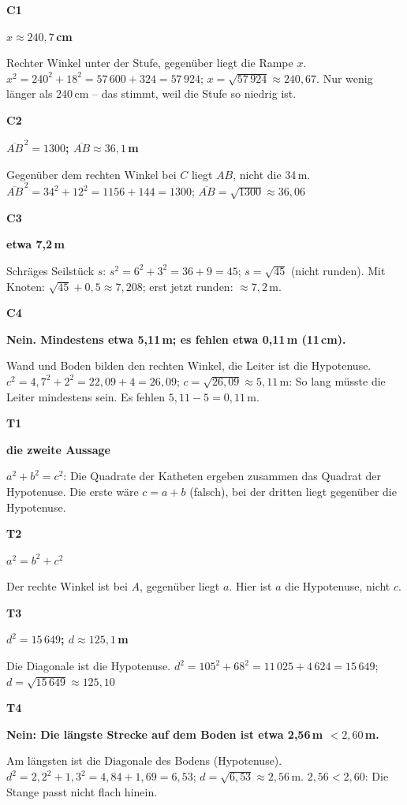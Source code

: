 \documentclass[11pt]{article}
\newcommand{\lsg}[3]{\par\noindent\begin{minipage}[t]{9mm}\textbf{#1}\end{minipage}%
  \begin{minipage}[t]{52mm}\raggedright\bfseries\boldmath #2\end{minipage}\hspace{3mm}%
  \begin{minipage}[t]{\dimexpr\linewidth-64mm\relax}\raggedright\small #3\end{minipage}\par\vspace{4pt}}
\begin{document}
\par\Needspace{25mm}\vspace{6pt}\noindent\colorbox{black!12}{}\hspace{2mm}{\bfseries Sachaufgaben: Leiter, Rampe, Gelände}\par\vspace{4pt}
\lsg{C1}{$x \approx 240{,}7$\,cm}{Rechter Winkel unter der Stufe, gegenüber liegt die Rampe $x$. $x^2 = 240^2 + 18^2 = 57\,600 + 324 = 57\,924$; $x = \sqrt{57\,924} \approx 240{,}67$. Nur wenig länger als 240\,cm – das stimmt, weil die Stufe so niedrig ist.}
\lsg{C2}{$\overline{AB}^{\,2} = 1300$; $\overline{AB} \approx 36{,}1$\,m}{Gegenüber dem rechten Winkel bei $C$ liegt $AB$, nicht die 34\,m. $\overline{AB}^{\,2} = 34^2 + 12^2 = 1156 + 144 = 1300$; $\overline{AB} = \sqrt{1300} \approx 36{,}06$}
\lsg{C3}{etwa 7,2\,m}{Schräges Seilstück $s$: $s^2 = 6^2 + 3^2 = 36 + 9 = 45$; $s = \sqrt{45}$ (nicht runden). Mit Knoten: $\sqrt{45} + 0{,}5 \approx 7{,}208$; erst jetzt runden: $\approx 7{,}2$\,m.}
\lsg{C4}{Nein. Mindestens etwa 5,11\,m; es fehlen etwa 0,11\,m (11\,cm).}{Wand und Boden bilden den rechten Winkel, die Leiter ist die Hypotenuse. $c^2 = 4{,}7^2 + 2^2 = 22{,}09 + 4 = 26{,}09$; $c = \sqrt{26{,}09} \approx 5{,}11$\,m: So lang müsste die Leiter mindestens sein. Es fehlen $5{,}11 - 5 = 0{,}11$\,m.}
\par\Needspace{25mm}\vspace{6pt}\noindent\colorbox{black!12}{}\hspace{2mm}{\bfseries Probetest}\par\vspace{4pt}
\lsg{T1}{die zweite Aussage}{$a^2 + b^2 = c^2$: Die Quadrate der Katheten ergeben zusammen das Quadrat der Hypotenuse. Die erste wäre $c = a + b$ (falsch), bei der dritten liegt gegenüber die Hypotenuse.}
\lsg{T2}{$a^2 = b^2 + c^2$}{Der rechte Winkel ist bei $A$, gegenüber liegt $a$. Hier ist $a$ die Hypotenuse, nicht $c$.}
\lsg{T3}{$d^2 = 15\,649$; $d \approx 125{,}1$\,m}{Die Diagonale ist die Hypotenuse. $d^2 = 105^2 + 68^2 = 11\,025 + 4\,624 = 15\,649$; $d = \sqrt{15\,649} \approx 125{,}10$}
\lsg{T4}{Nein: Die längste Strecke auf dem Boden ist etwa 2,56\,m $< 2{,}60$\,m.}{Am längsten ist die Diagonale des Bodens (Hypotenuse). $d^2 = 2{,}2^2 + 1{,}3^2 = 4{,}84 + 1{,}69 = 6{,}53$; $d = \sqrt{6{,}53} \approx 2{,}56$\,m. $2{,}56 < 2{,}60$: Die Stange passt nicht flach hinein.}
\end{document}

